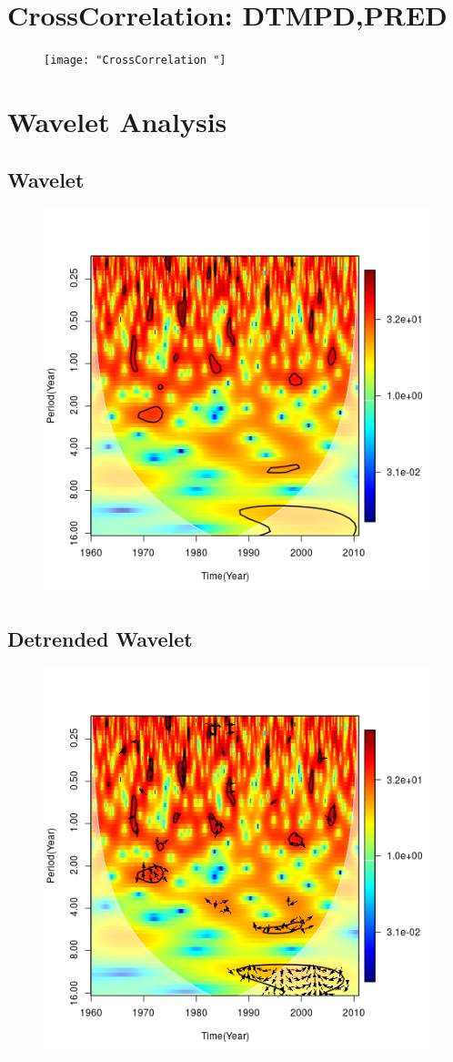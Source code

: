 \documentclass[12pt,a4paper]{article}
\begin{document}
\section{CrossCorrelation: DTMPD,PRED}
\begin{figure}[h]
	\centering
	\texttt{[image: "CrossCorrelation "]}
	\caption{}
	\label{fig:crosscorrelation-}
\end{figure}
\newpage
\section{Wavelet Analysis}
\subsection{Wavelet}
\begin{figure}[h]
	\centering
	\includegraphics[width=0.7\linewidth]{wavelet}
	\caption{}
	\label{fig:wavelet}
\end{figure}

\newpage
\subsection{Detrended Wavelet}
\begin{figure}[h]
	\centering
	\includegraphics[width=0.7\linewidth]{waveletD}
	\caption{}
	\label{fig:waveletd}
\end{figure}
\newpage
\end{document}
